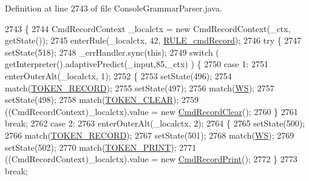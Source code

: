 Definition at line 2743 of file Console\+Grammar\+Parser.\+java.


\begin{DoxyCode}
2743                                                                         \{
2744     CmdRecordContext \_localctx = \textcolor{keyword}{new} CmdRecordContext(\_ctx, getState());
2745     enterRule(\_localctx, 42, \hyperlink{classgov_1_1nasa_1_1jpf_1_1inspector_1_1client_1_1parser_1_1_console_grammar_parser_ad803493ba668c8a5273f286630b621c7}{RULE\_cmdRecord});
2746     \textcolor{keywordflow}{try} \{
2747       setState(518);
2748       \_errHandler.sync(\textcolor{keyword}{this});
2749       \textcolor{keywordflow}{switch} ( getInterpreter().adaptivePredict(\_input,85,\_ctx) ) \{
2750       \textcolor{keywordflow}{case} 1:
2751         enterOuterAlt(\_localctx, 1);
2752         \{
2753         setState(496);
2754         match(\hyperlink{classgov_1_1nasa_1_1jpf_1_1inspector_1_1client_1_1parser_1_1_console_grammar_parser_a344f8da5c5fff173cb90ded13f52017f}{TOKEN\_RECORD});
2755         setState(497);
2756         match(\hyperlink{classgov_1_1nasa_1_1jpf_1_1inspector_1_1client_1_1parser_1_1_console_grammar_parser_a6914a3a3adbc350b12a7df9d1b24abf1}{WS});
2757         setState(498);
2758         match(\hyperlink{classgov_1_1nasa_1_1jpf_1_1inspector_1_1client_1_1parser_1_1_console_grammar_parser_a529c6643b2f5224445567be6b25b4b42}{TOKEN\_CLEAR});
2759          ((CmdRecordContext)\_localctx).value =  \textcolor{keyword}{new} \hyperlink{classgov_1_1nasa_1_1jpf_1_1inspector_1_1client_1_1commands_1_1_cmd_record_clear}{CmdRecordClear}(); 
2760         \}
2761         \textcolor{keywordflow}{break};
2762       \textcolor{keywordflow}{case} 2:
2763         enterOuterAlt(\_localctx, 2);
2764         \{
2765         setState(500);
2766         match(\hyperlink{classgov_1_1nasa_1_1jpf_1_1inspector_1_1client_1_1parser_1_1_console_grammar_parser_a344f8da5c5fff173cb90ded13f52017f}{TOKEN\_RECORD});
2767         setState(501);
2768         match(\hyperlink{classgov_1_1nasa_1_1jpf_1_1inspector_1_1client_1_1parser_1_1_console_grammar_parser_a6914a3a3adbc350b12a7df9d1b24abf1}{WS});
2769         setState(502);
2770         match(\hyperlink{classgov_1_1nasa_1_1jpf_1_1inspector_1_1client_1_1parser_1_1_console_grammar_parser_a26f7fc768e8725fbe68d0edaa63d6647}{TOKEN\_PRINT});
2771          ((CmdRecordContext)\_localctx).value =  \textcolor{keyword}{new} \hyperlink{classgov_1_1nasa_1_1jpf_1_1inspector_1_1client_1_1commands_1_1_cmd_record_print}{CmdRecordPrint}(); 
2772         \}
2773         \textcolor{keywordflow}{break};

\end{DoxyCode}
